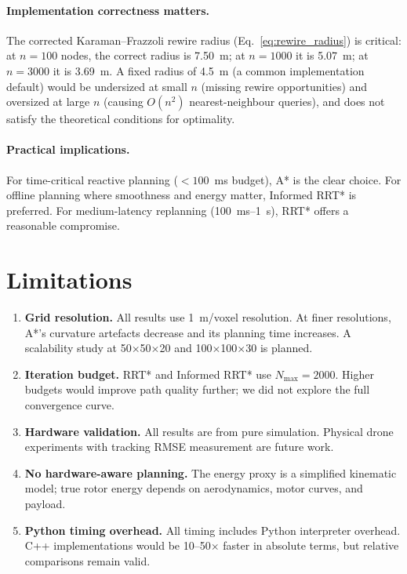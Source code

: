 \documentclass[10pt,twocolumn]{article}
\begin{document}
\paragraph{Implementation correctness matters.}
The corrected Karaman--Frazzoli rewire radius (Eq.~\ref{eq:rewire_radius})
is critical: at $n=100$ nodes, the correct radius is 7.50~m; at
$n=1000$ it is 5.07~m; at $n=3000$ it is 3.69~m.
A fixed radius of 4.5~m (a common implementation default) would be
undersized at small $n$ (missing rewire opportunities) and oversized at
large $n$ (causing $O(n^2)$ nearest-neighbour queries), and does not
satisfy the theoretical conditions for optimality.

\paragraph{Practical implications.}
For time-critical reactive planning ($<100$~ms budget), A* is the
clear choice.
For offline planning where smoothness and energy matter, Informed RRT*
is preferred.
For medium-latency replanning (100~ms--1~s), RRT* offers a reasonable
compromise.

\section{Limitations}\label{sec:limitations}

\begin{enumerate}
\item \textbf{Grid resolution.}  All results use 1~m/voxel resolution.
  At finer resolutions, A*'s curvature artefacts decrease and its
  planning time increases.  A scalability study at 50$\times$50$\times$20
  and 100$\times$100$\times$30 is planned.

\item \textbf{Iteration budget.}  RRT* and Informed RRT* use
  $N_\mathrm{max}=2000$.  Higher budgets would improve path quality
  further; we did not explore the full convergence curve.

\item \textbf{Hardware validation.}  All results are from pure simulation.
  Physical drone experiments with tracking RMSE measurement are future
  work.

\item \textbf{No hardware-aware planning.}  The energy proxy is a
  simplified kinematic model; true rotor energy depends on aerodynamics,
  motor curves, and payload.

\item \textbf{Python timing overhead.}  All timing includes Python
  interpreter overhead.  C++ implementations would be 10--50$\times$
  faster in absolute terms, but relative comparisons remain valid.
\end{enumerate}
\end{document}

